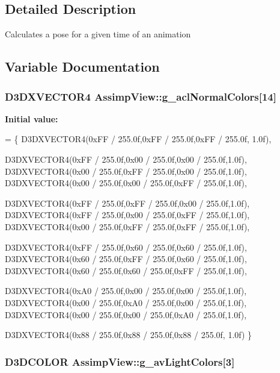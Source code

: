 \subsection{Detailed Description}
Calculates a pose for a given time of an animation 

\subsection{Variable Documentation}
\hypertarget{namespace_assimp_view_a73b373fa45f483893d5c22668c64818a}{
\subsubsection[{g\+\_\+acl\+Normal\+Colors}]{\setlength{\rightskip}{0pt plus 5cm}D3\+D\+X\+V\+E\+C\+T\+O\+R4 Assimp\+View\+::g\+\_\+acl\+Normal\+Colors\mbox{[}14\mbox{]}}}\label{namespace_assimp_view_a73b373fa45f483893d5c22668c64818a}
{\bfseries Initial value\+:}
\begin{DoxyCode}
= 
\{
    D3DXVECTOR4(0xFF / 255.0f,0xFF / 255.0f,0xFF / 255.0f, 1.0f), 

    D3DXVECTOR4(0xFF / 255.0f,0x00 / 255.0f,0x00 / 255.0f,1.0f), 
    D3DXVECTOR4(0x00 / 255.0f,0xFF / 255.0f,0x00 / 255.0f,1.0f), 
    D3DXVECTOR4(0x00 / 255.0f,0x00 / 255.0f,0xFF / 255.0f,1.0f), 

    D3DXVECTOR4(0xFF / 255.0f,0xFF / 255.0f,0x00 / 255.0f,1.0f), 
    D3DXVECTOR4(0xFF / 255.0f,0x00 / 255.0f,0xFF / 255.0f,1.0f), 
    D3DXVECTOR4(0x00 / 255.0f,0xFF / 255.0f,0xFF / 255.0f,1.0f), 

    D3DXVECTOR4(0xFF / 255.0f,0x60 / 255.0f,0x60 / 255.0f,1.0f), 
    D3DXVECTOR4(0x60 / 255.0f,0xFF / 255.0f,0x60 / 255.0f,1.0f), 
    D3DXVECTOR4(0x60 / 255.0f,0x60 / 255.0f,0xFF / 255.0f,1.0f), 

    D3DXVECTOR4(0xA0 / 255.0f,0x00 / 255.0f,0x00 / 255.0f,1.0f), 
    D3DXVECTOR4(0x00 / 255.0f,0xA0 / 255.0f,0x00 / 255.0f,1.0f), 
    D3DXVECTOR4(0x00 / 255.0f,0x00 / 255.0f,0xA0 / 255.0f,1.0f), 

    D3DXVECTOR4(0x88 / 255.0f,0x88 / 255.0f,0x88 / 255.0f, 1.0f) 
\}
\end{DoxyCode}
\hypertarget{namespace_assimp_view_a7261b9fd2159053db3c27da499623a5b}{
\subsubsection[{g\+\_\+av\+Light\+Colors}]{\setlength{\rightskip}{0pt plus 5cm}D3\+D\+C\+O\+L\+O\+R Assimp\+View\+::g\+\_\+av\+Light\+Colors\mbox{[}3\mbox{]}}}\label{namespace_assimp_view_a7261b9fd2159053db3c27da499623a5b}
